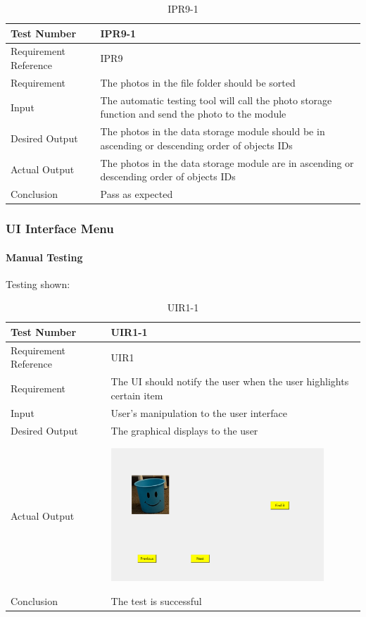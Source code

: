 \documentclass[12pt, titlepage]{article}
\begin{document}
\begin{table}[H]
\begin{center}
\begin{tabular}{|l | m{9cm}|}
\hline
  Test Number & IPR9-1\\
  \hline
  Requirement Reference & IPR9\\
  \hline
  Requirement & The photos in the file folder should be sorted\\
  \hline
  Input & The automatic testing tool will call the photo storage function and send the photo to the module\\
  \hline
  Desired Output & The photos in the data storage module should be in ascending or descending order of objects IDs\\
  \hline
  Actual Output & The photos in the data storage module are in ascending or descending order of objects IDs\\
  \hline
  Conclusion & Pass as expected\\
  \hline
\end{tabular}
\end{center}       
\caption{IPR9-1}
\end{table}

\subsubsection{UI Interface Menu}
\paragraph{Manual Testing}{Testing shown:}

\begin{table}[H]
\begin{center}
\begin{tabular}{|l | m{9cm}|}
\hline
  Test Number & UIR1-1\\
  \hline
  Requirement Reference & UIR1\\
  \hline
  Requirement & The UI should notify the user when the user highlights certain item\\
  \hline
  Input & User's manipulation to the user interface\\
  \hline
  Desired Output & The graphical displays to the user\\
  \hline
  Actual Output & \includegraphics[width=80mm, height=55mm]{11.png}\\
  \hline
  Conclusion & The test is successful\\
  \hline
\end{tabular}
\end{center}    
\caption{UIR1-1}
\end{table}
\end{document}
